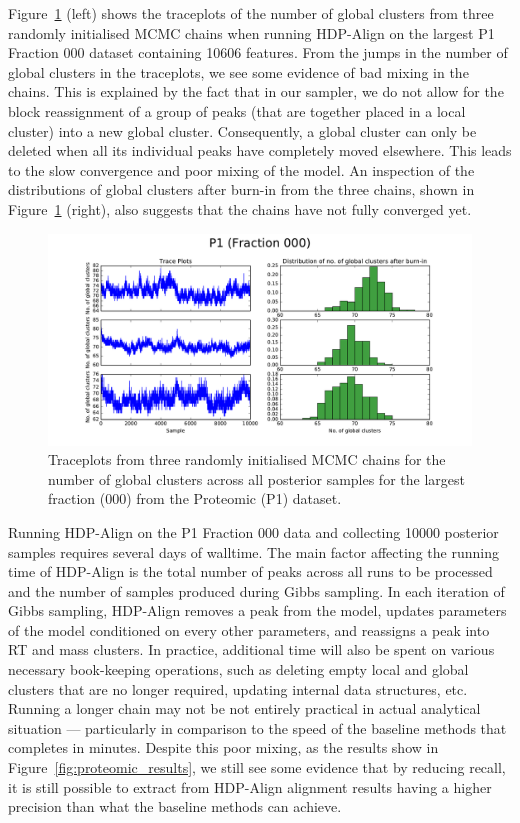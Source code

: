 Figure~\ref{fig:traceplot_000} (left) shows the traceplots of the number of global clusters from three randomly initialised MCMC chains when running HDP-Align on the largest P1 Fraction 000 dataset containing 10606 features. From the jumps in the number of global clusters in the traceplots, we see some evidence of bad mixing in the chains. This is explained by the fact that in our sampler, we do not allow for the block reassignment of a group of peaks (that are together placed in a local cluster) into a new global cluster. Consequently, a global cluster can only be deleted when all its individual peaks have completely moved elsewhere. This leads to the slow convergence and poor mixing of the model. An inspection of the distributions of global clusters after burn-in from the three chains, shown in Figure~\ref{fig:traceplot_000} (right), also suggests that the chains have not fully converged yet. 

\begin{figure}[!htbp]
\centering\includegraphics[width=0.7\linewidth]{06-hdp/figures/traceplot_p1_000.pdf}
\centering\caption{\label{fig:traceplot_000}Traceplots from three randomly initialised MCMC chains for the number of global clusters across all posterior samples for the largest fraction (000) from the Proteomic (P1) dataset.}
\end{figure}

Running HDP-Align on the P1 Fraction 000 data and collecting 10000 posterior samples requires several days of walltime. The main factor affecting the running time of HDP-Align is the total number of peaks across all runs to be processed and the number of samples produced during Gibbs sampling. In each iteration of Gibbs sampling, HDP-Align removes a peak from the model, updates parameters of the model conditioned on every other parameters, and reassigns a peak into RT and mass clusters. In practice, additional time will also be spent on various necessary book-keeping operations, such as deleting empty local and global clusters that are no longer required, updating internal data structures, etc. Running a longer chain may not be not entirely practical in actual analytical situation --- particularly in comparison to the speed of the baseline methods that completes in minutes. Despite this poor mixing, as the results show in Figure~\ref{fig:proteomic_results}, we still see some evidence that by reducing recall, it is still possible to extract from HDP-Align alignment results having a higher precision than what the baseline methods can achieve.

